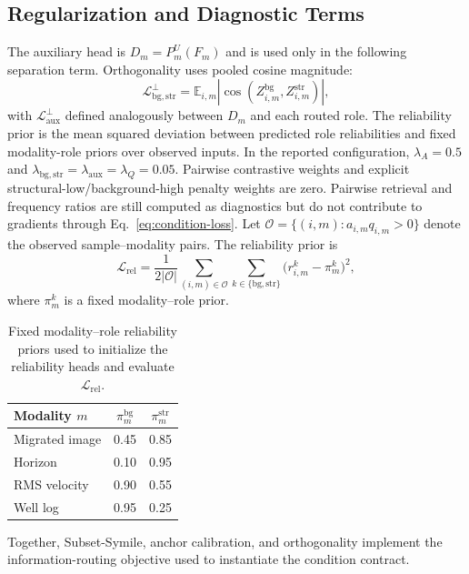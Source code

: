 \subsection{Regularization and Diagnostic Terms}
The auxiliary head is $D_m=P_m^U(F_m)$ and is used only in the following separation term. Orthogonality uses pooled cosine magnitude:
\begin{equation}
\mathcal L_{\mathrm{bg,str}}^{\perp}
=\mathbb E_{i,m}|\cos(Z_{i,m}^{\mathrm{bg}},Z_{i,m}^{\mathrm{str}})|,
\end{equation}
with $\mathcal L_{\mathrm{aux}}^{\perp}$ defined analogously between $D_m$ and each routed role. The reliability prior is the mean squared deviation between predicted role reliabilities and fixed modality-role priors over observed inputs. In the reported configuration, $\lambda_A=0.5$ and $\lambda_{\mathrm{bg,str}}=\lambda_{\mathrm{aux}}=\lambda_Q=0.05$. Pairwise contrastive weights and explicit structural-low/background-high penalty weights are zero. Pairwise retrieval and frequency ratios are still computed as diagnostics but do not contribute to gradients through Eq.~\ref{eq:condition-loss}. Let $\mathcal O=\{(i,m):a_{i,m}q_{i,m}>0\}$ denote the observed sample--modality pairs. The reliability prior is
\begin{equation}
\mathcal L_{\mathrm{rel}}
 =\frac{1}{2|\mathcal O|}
 \sum_{(i,m)\in\mathcal O}
 \sum_{k\in\{\mathrm{bg},\mathrm{str}\}}
 \bigl(r_{i,m}^k-\pi_m^k\bigr)^2,
\end{equation}
where $\pi_m^k$ is a fixed modality--role prior.

\begin{table}[t]
\centering
\small
\begin{tabular}{@{}lcc@{}}
\toprule
Modality $m$ & $\pi_m^{\mathrm{bg}}$ & $\pi_m^{\mathrm{str}}$ \\
\midrule
Migrated image & 0.45 & 0.85 \\
Horizon & 0.10 & 0.95 \\
RMS velocity & 0.90 & 0.55 \\
Well log & 0.95 & 0.25 \\
\bottomrule
\end{tabular}
\caption{Fixed modality--role reliability priors used to initialize the reliability heads and evaluate $\mathcal L_{\mathrm{rel}}$.}
\label{tab:reliability-priors}
\end{table}

Together, Subset-Symile, anchor calibration, and orthogonality implement the information-routing objective used to instantiate the condition contract.


